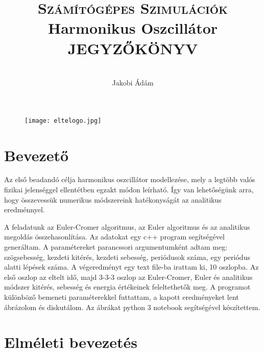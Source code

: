 \documentclass[a4paper,12pt]{article}
\begin{document}
	\begin{titlepage}
\author{\\Jakobi Ádám  \\ 
}

\title{\textsc{Számítógépes Szimulációk} \\ 
\huge{\textbf{Harmonikus Oszcillátor}\\
\vspace{10pt}\textsc{JEGYZŐKÖNYV}}}


	
\centering
\maketitle
	\thispagestyle{empty}
\begin{figure}[h!]
\centering
\texttt{[image: eltelogo.jpg]}
\end{figure}
	\end{titlepage}
	
\newpage

\section{Bevezető}
Az első beadandó célja harmonikus oszcillátor modellezése, mely a legtöbb valós fizikai jelenséggel ellentétben egzakt módon leírható. Így van lehetőségünk arra, hogy összevessük numerikus módszereink hatékonyságát az analitikus eredménnyel.

A feladatunk az Euler-Cromer algoritmus, az Euler algoritmus és az analitikus megoldás összehasonlítása. Az adatokat egy c++ program segítségével generáltam. A paramétereket parancssori argumentumként adtam meg: szögsebesség, kezdeti kitérés, kezdeti sebesség, periódusok száma, egy periódus alatti lépések száma. A végeredményt egy text file-ba irattam ki, 10 oszlopba. Az első oszlop az eltelt idő, majd 3-3-3 oszlop az Euler-Cromer, Euler és analitikus módszer kitérés, sebesség és energia értékeinek feleltethetők meg. A programot különböző bemeneti paraméterekkel futtattam, a kapott eredményeket lent ábrázolom és diskutálom. Az ábrákat python 3 notebook segítségével készítettem.

\section{Elméleti bevezetés}
\end{document}
